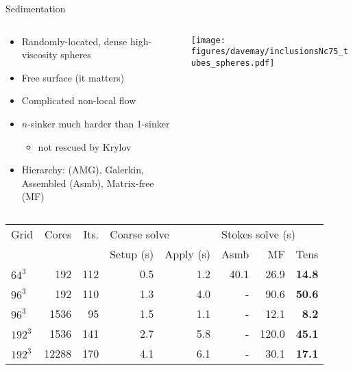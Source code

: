 \documentclass{beamer}
\begin{document}
\begin{frame}{Sedimentation}
  \begin{columns}
    \begin{column}{0.6\textwidth}
      \begin{itemize}
      \item Randomly-located, dense high-viscosity spheres
      \item Free surface (it matters)
      \item Complicated non-local flow
      \item $n$-sinker much harder than 1-sinker
        \begin{itemize}
        \item not rescued by Krylov
        \end{itemize}
      \item Hierarchy: (AMG), Galerkin, Assembled (Asmb), Matrix-free (MF)
      \end{itemize}
    \end{column}
    \begin{column}{0.4\textwidth}
      \texttt{[image: figures/davemay/inclusionsNc75\_tubes\_spheres.pdf]}
    \end{column}
  \end{columns}
  \begin{tabular}{l r r rr rrr}
    \toprule
    Grid  &Cores  &Its.  &\multicolumn{2}{l}{Coarse solve}   &\multicolumn{3}{l}{Stokes solve (s)}  \\
          &            &      &Setup (s) &Apply (s)                      &Asmb   &MF    &Tens   \\
    \midrule
    $64^3$	&192 &112	&0.5  &1.2		&40.1 &26.9 &{\bf 14.8} \\
    $96^3$	&192 &110	&1.3  &4.0		&- &90.6 &{\bf 50.6} \\
    $96^3$	&1536 &95	&1.5  &1.1		&- &12.1 &{\bf 8.2} \\
    $192^3$	&1536 &141	&2.7  &5.8		&- &120.0 &{\bf 45.1} \\
    $192^3$	&12288 &170	&4.1  &6.1		&- &30.1 &{\bf 17.1} \\
    \bottomrule
  \end{tabular}
\end{frame}
\end{document}
